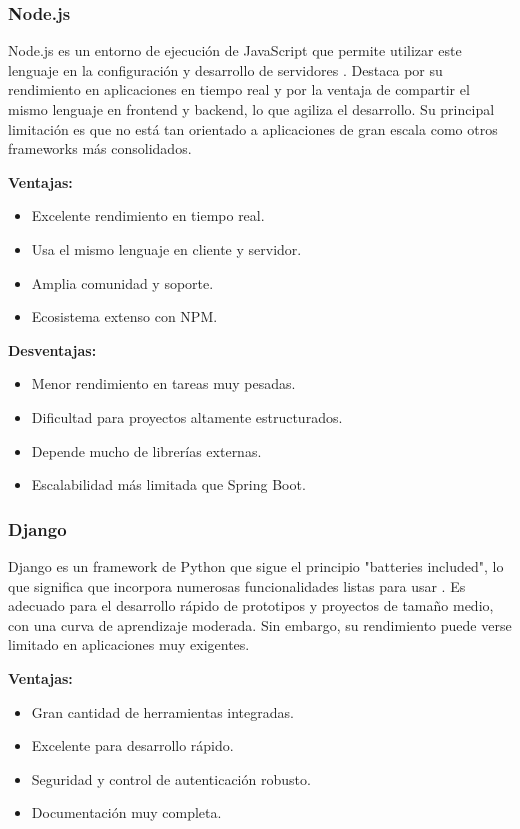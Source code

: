 \subsubsection{Node.js}
Node.js es un entorno de ejecución de JavaScript que permite utilizar este lenguaje en la configuración y desarrollo de servidores \cite{nodeDocs}. Destaca por su rendimiento en aplicaciones en tiempo real y por la ventaja de compartir el mismo lenguaje en frontend y backend, lo que agiliza el desarrollo. Su principal limitación es que no está tan orientado a aplicaciones de gran escala como otros frameworks más consolidados.

\textbf{Ventajas:}
\begin{itemize}
    \item Excelente rendimiento en tiempo real.
    \item Usa el mismo lenguaje en cliente y servidor.
    \item Amplia comunidad y soporte.
    \item Ecosistema extenso con NPM.
\end{itemize}

\textbf{Desventajas:}
\begin{itemize}
    \item Menor rendimiento en tareas muy pesadas.
    \item Dificultad para proyectos altamente estructurados.
    \item Depende mucho de librerías externas.
    \item Escalabilidad más limitada que Spring Boot.
\end{itemize}

\subsubsection{Django}
Django es un framework de Python que sigue el principio "batteries included", lo que significa que incorpora numerosas funcionalidades listas para usar \cite{djangoDocs}. Es adecuado para el desarrollo rápido de prototipos y proyectos de tamaño medio, con una curva de aprendizaje moderada. Sin embargo, su rendimiento puede verse limitado en aplicaciones muy exigentes.

\textbf{Ventajas:}
\begin{itemize}
    \item Gran cantidad de herramientas integradas.
    \item Excelente para desarrollo rápido.
    \item Seguridad y control de autenticación robusto.
    \item Documentación muy completa.
\end{itemize}

